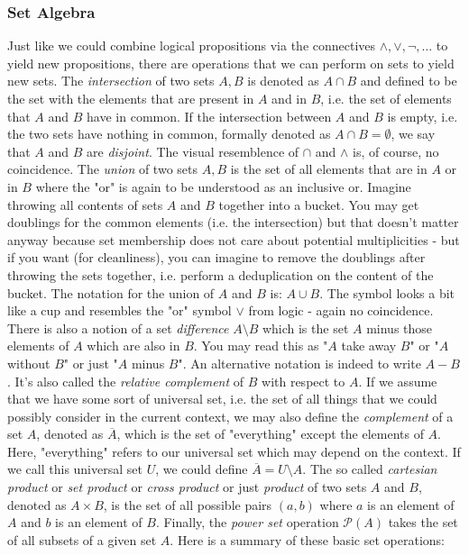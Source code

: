 \subsubsection{Set Algebra} \label{Par:SetAlgebra} Just like we could combine logical propositions via the connectives $\wedge, \vee, \neg, \ldots$ to yield new propositions, there are operations that we can perform on sets to yield new sets. The \emph{intersection} of two sets $A, B$ is denoted as $A \cap B$ and defined to be the set with the elements that are present in $A$ and in $B$, i.e. the set of elements that $A$ and $B$ have in common. If the intersection between $A$ and $B$ is empty, i.e. the two sets have nothing in common, formally denoted as $A \cap B = \emptyset$, we say that $A$ and $B$ are \emph{disjoint}. The visual resemblence of $\cap$ and $\wedge$ is, of course, no coincidence. The \emph{union} of two sets $A,B$ is the set of all elements that are in $A$ or in $B$ where the "or" is again to be understood as an inclusive or. Imagine throwing all contents of sets $A$ and $B$ together into a bucket. You may get doublings for the common elements (i.e. the intersection) but that doesn't matter anyway because set membership does not care about potential multiplicities - but if you want (for cleanliness), you can imagine to remove the doublings after throwing the sets together, i.e. perform a deduplication on the content of the bucket. The notation for the union of $A$ and $B$ is: $A \cup B$. The symbol looks a bit like a cup and resembles the "or" symbol $\vee$ from logic - again no coincidence. There is also a notion of a set \emph{difference} $A \setminus B$ which is the set $A$ minus those elements of $A$ which are also in $B$. You may read this as "$A$ take away $B$" or "$A$ without $B$" or just "$A$ minus $B$". An alternative notation is indeed to write $A - B$. It's also called the \emph{relative complement} of $B$ with respect to $A$. If we assume that we have some sort of universal set, i.e. the set of all things that we could possibly consider in the current context, we may also define the \emph{complement} of a set $A$, denoted as $\overline{A}$, which is the set of "everything" except the elements of $A$. Here, "everything" refers to our universal set which may depend on the context. If we call this universal set $U$, we could define $\overline{A} = U \setminus A$. The so called \emph{cartesian product} or \emph{set product} or \emph{cross product} or just \emph{product} of two sets $A$ and $B$, denoted as $A \times B$, is the set of all possible pairs $(a,b)$ where $a$ is an element of $A$ and $b$ is an element of $B$. Finally, the \emph{power set} operation $\mathcal{P}(A)$ takes the set of all subsets of a given set $A$. Here is a summary of these basic set operations:
